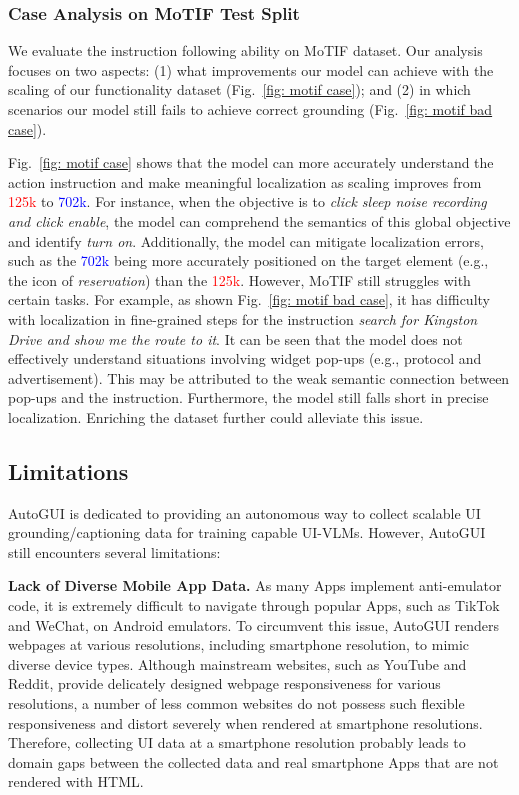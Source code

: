 \subsubsection{Case Analysis on MoTIF Test Split}


We evaluate the instruction following ability on MoTIF dataset. Our analysis focuses on two aspects: (1) what improvements our model can achieve with the scaling of our functionality dataset (Fig.~\ref{fig: motif case}); and (2)  in which scenarios our model still fails to achieve correct grounding (Fig.~\ref{fig: motif bad case}).

Fig.~\ref{fig: motif case} shows that the model can more accurately understand the action instruction and make meaningful localization as scaling improves from \textcolor{red}{125k} to \textcolor{blue}{702k}. For instance, when the objective is to \textit{click sleep noise recording and click enable}, the model can comprehend the semantics of this global objective and identify \textit{turn on}. Additionally, the model can mitigate localization errors, such as the \textcolor{blue}{702k} being more accurately positioned on the target element (e.g., the icon of \textit{reservation}) than the \textcolor{red}{125k}.
However, MoTIF still struggles with certain tasks. For example, as shown Fig.~\ref{fig: motif bad case}, it has difficulty with localization in fine-grained steps for the instruction \textit{search for Kingston Drive and show me the route to it}. It can be seen that the model does not effectively understand situations involving widget pop-ups (e.g., protocol and advertisement). This may be attributed to the weak semantic connection between pop-ups and the instruction. Furthermore, the model still falls short in precise localization. Enriching the dataset further could alleviate this issue.




\subsection{Limitations}
AutoGUI is dedicated to providing an autonomous way to collect scalable UI grounding/captioning data for training capable UI-VLMs. However, AutoGUI still encounters several limitations:

\noindent\textbf{Lack of Diverse Mobile App Data.} As many Apps implement anti-emulator code, it is extremely difficult to navigate through popular Apps, such as TikTok and WeChat, on Android emulators. To circumvent this issue, AutoGUI renders webpages at various resolutions, including smartphone resolution, to mimic diverse device types. Although mainstream websites, such as YouTube and Reddit, provide delicately designed webpage responsiveness for various resolutions, a number of less common websites do not possess such flexible responsiveness and distort severely when rendered at smartphone resolutions. Therefore, collecting UI data at a smartphone resolution probably leads to domain gaps between the collected data and real smartphone Apps that are not rendered with HTML.

